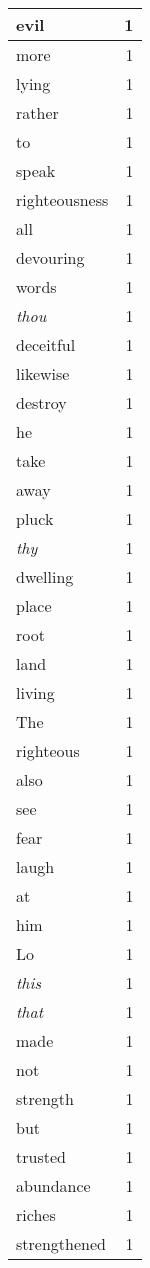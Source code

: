 \begin{center}
\begin{longtable}{l|r}
evil & 1 \\ \hline
more & 1 \\ \hline
lying & 1 \\ \hline
rather & 1 \\ \hline
to & 1 \\ \hline
speak & 1 \\ \hline
righteousness & 1 \\ \hline
all & 1 \\ \hline
devouring & 1 \\ \hline
words & 1 \\ \hline
\emph{thou} & 1 \\ \hline
deceitful & 1 \\ \hline
likewise & 1 \\ \hline
destroy & 1 \\ \hline
he & 1 \\ \hline
take & 1 \\ \hline
away & 1 \\ \hline
pluck & 1 \\ \hline
\emph{thy} & 1 \\ \hline
dwelling & 1 \\ \hline
place & 1 \\ \hline
root & 1 \\ \hline
land & 1 \\ \hline
living & 1 \\ \hline
The & 1 \\ \hline
righteous & 1 \\ \hline
also & 1 \\ \hline
see & 1 \\ \hline
fear & 1 \\ \hline
laugh & 1 \\ \hline
at & 1 \\ \hline
him & 1 \\ \hline
Lo & 1 \\ \hline
\emph{this} & 1 \\ \hline
\emph{that} & 1 \\ \hline
made & 1 \\ \hline
not & 1 \\ \hline
strength & 1 \\ \hline
but & 1 \\ \hline
trusted & 1 \\ \hline
abundance & 1 \\ \hline
riches & 1 \\ \hline
strengthened & 1 \\ \hline

\end{longtable}
\end{center}

